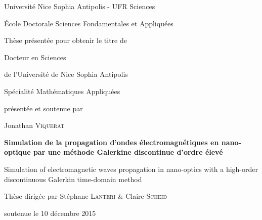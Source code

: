 \documentclass[11pt]{article}
\begin{document}
\begin{center}

{\huge Universit\'e Nice Sophia Antipolis - UFR Sciences}

{\large \'Ecole Doctorale Sciences Fondamentales et Appliqu\'ees}

\vspace*{2.5em}

{\large Th\`ese pr\'esent\'ee pour obtenir le titre de}

\vspace*{1em}

{\huge Docteur en Sciences} 

{\large de l'Universit\'e de Nice Sophia Antipolis}

{\large Sp\'ecialit\'e Math\'ematiques Appliqu\'ees}
 
\vspace*{2.5em}

{\large pr\'esent\'ee et soutenue par}

{\huge Jonathan \textsc{Viquerat}}

\vspace*{2.5em}

{{\color{blue1}{\rule[0mm]{0.95\linewidth}{1.5pt}}}
\begin{spacing}{1.0}
	\Huge \bfseries 
	Simulation de la propagation d'ondes \'electromagn\'etiques en nano-optique par une m\'ethode Galerkine discontinue d'ordre \'elev\'e \end{spacing}
	\vspace*{-2em}
	{\color{blue1}{\rule[1mm]{0.95\linewidth}{0.5pt}}}
	\LARGE \bfseries
	\begin{spacing}{1.0}
		\textcolor{gray!70!black}{Simulation of electromagnetic waves propagation in nano-optics with a high-order discontinuous Galerkin time-domain method}
		{\color{blue1}{\rule[0mm]{0.95\linewidth}{1.5pt}}}
	\end{spacing}}

\vspace*{2.5em}

{\large Th\`ese dirig\'ee par St\'ephane \textsc{Lanteri} \&{} Claire \textsc{Scheid}}

{\large soutenue le 10 d\'ecembre 2015}

\vspace*{2.5em}


\end{center}
\end{document}
